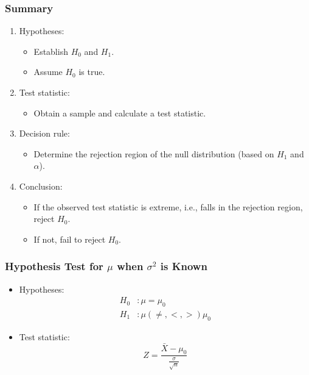 \documentclass[12pt]{beamer}
\begin{document}
\begin{frame}
	\frametitle{Summary}
	
	\begin{enumerate}[label=\textcolor{blue}{\arabic*.}]
		\item Hypotheses:
		\begin{itemize}[label={\color{blue}$\blacktriangleright$}]
			\item Establish $H_0$ and $H_1$.
			\item Assume $H_0$ is true.
		\end{itemize}
		
		\item Test statistic:
		\begin{itemize}[label={\color{blue}$\blacktriangleright$}]
			\item Obtain a sample and calculate a test statistic.
		\end{itemize}
		
		\item Decision rule:
		\begin{itemize}[label={\color{blue}$\blacktriangleright$}]
			\item Determine the rejection region of the null distribution (based on $H_1$ and $\alpha$).
		\end{itemize}
		
		\item Conclusion:
		\begin{itemize}[label={\color{blue}$\blacktriangleright$}]
			\item If the observed test statistic is extreme, i.e., falls in the rejection region, reject $H_0$.
			\item If not, fail to reject $H_0$.
		\end{itemize}
	\end{enumerate}
	
\end{frame}
\begin{frame}
	\frametitle{Hypothesis Test for $\mu$ when $\sigma^2$ is Known}
	
	\begin{itemize}[label={\color{blue}$\blacktriangleright$}]
		\item Hypotheses:
		\begin{align*}
			H_0 &: \mu = \mu_0 \\
			H_1 &: \mu(\neq, <, >)\mu_0
		\end{align*}
		
		\item Test statistic:
		\begin{equation*}
			Z = \frac{\bar{X} - \mu_0}{\frac{\sigma}{\sqrt{n}}}
		\end{equation*}
	\end{itemize}
	
\end{frame}
\end{document}
